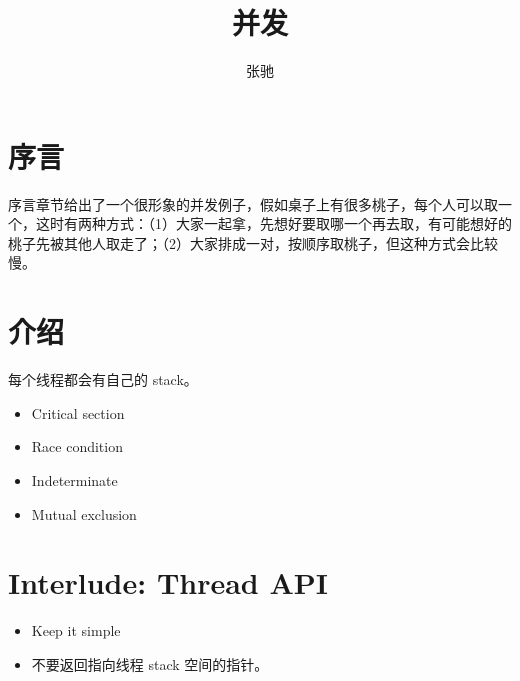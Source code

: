 \documentclass[letterpaper,11pt]{article}
\begin{document}
\begin{CJK}{UTF8}{gbsn}

\title{并发}
\author{张驰}
\maketitle

\section{序言}

序言章节给出了一个很形象的并发例子，假如桌子上有很多桃子，每个人可以取一个，这时有两种方式：（1）大家一起拿，先想好要取哪一个再去取，有可能想好的桃子先被其他人取走了；（2）大家排成一对，按顺序取桃子，但这种方式会比较慢。

\section{介绍}

每个线程都会有自己的 stack。

\begin{itemize}
\item Critical section
\item Race condition
\item Indeterminate
\item Mutual exclusion
\end{itemize}

\section {Interlude: Thread API}

\begin{itemize}
\item Keep it simple
\item 不要返回指向线程 stack 空间的指针。
\end{itemize}



\end{CJK}
\end{document}
